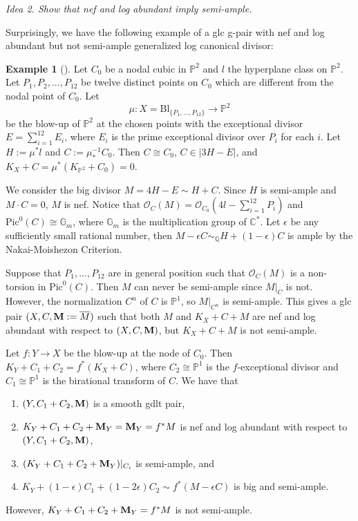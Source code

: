 \documentclass[11pt]{amsart}
\numberwithin{equation}{section}
\newcommand{\Mm}{{\bf{M}}}
\newcommand{\Cc}{\mathbb{C}}
\newcommand{\Pp}{\mathbb{P}}
\newcommand{\Qq}{\mathbb{Q}}
\newcommand{\Oo}{\mathcal{O}}
\newcommand{\Pic}{\mathrm{Pic}}
\theoremstyle{definition}
\theoremstyle{definition}
\newtheorem{ex}[thm]{Example}
\theoremstyle{definition}
\begin{document}
\smallskip

\noindent\textit{Idea 2. Show that nef and log abundant imply semi-ample.}

\smallskip

Surprisingly, we have the following example of a glc g-pair with nef
and log abundant but not semi-ample generalized log canonical divisor:

\begin{ex}[{\cite[Example 1.4]{LX22}}]\label{ex: log abundant not semi-ample}
  Let $C_0$ be a nodal cubic in $\Pp^2$ and $l$ the hyperplane class
  on $\Pp^2$. Let $P_1,P_2,...,P_{12}$ be twelve distinct points on
  $C_0$ which are different from the nodal point of $C_0$. Let
  $$
  \mu:X=\text{Bl}_{\{P_1,...,P_{12}\}}\to\Pp^2
  $$
  be the blow-up of $\Pp^2$ at the chosen points with the exceptional
  divisor $E=\sum_{i=1}^{12}E_i$, where $E_i$ is the prime
  exceptional divisor over $P_i$ for each $i$. Let $H:=\mu^*l$ and
  $C:=\mu^{-1}_*C_0$. Then $C\cong C_0$, $C\in|3H-E|$, and
  $K_X+C=\mu^*(K_{\Pp^2}+C_0)=0$.

  We consider the big divisor $M=4H-E\sim H+C$. Since $H$ is
  semi-ample and $M\cdot C=0$, $M$ is nef. Notice that
  $\Oo_C(M)=\Oo_{C_0}(4l-\sum_{i=1}^{12}P_i)$ and
  $\Pic^0(C)\cong\mathbb G_m$, where $\mathbb G_m$ is the
  multiplication group of $\Cc^*$. Let $\epsilon$ be any sufficiently
  small rational number, then $M-\epsilon C\sim_{\Qq}H+(1-\epsilon)C$
  is ample by the Nakai-Moishezon Criterion.

  Suppose that $P_1,...,P_{12}$ are in general position such that
  $\Oo_C(M)$ is a non-torsion in $\Pic^0(C)$. Then $M$ can never be
  semi-ample since $M|_C$ is not. However, the normalization $C^n$ of
  $C$ is $\Pp^1$, so $M|_{C^n}$ is semi-ample. This gives a glc pair
  $(X,C,\Mm:=\overline{M})$ such that both $M$ and $K_X+C+M$ are nef
  and log abundant with respect to $(X,C,\Mm)$, but $K_X+C+M$ is not semi-ample.

  Let $f: Y\to X$ be the blow-up at the node of $C_0$. Then
  $K_Y+C_1+C_2=f^*(K_X+C)$, where $C_2\cong \Pp^1$ is the
  $f$-exceptional divisor and $C_1\cong \Pp^1$ is the birational
  transform of $C$. We have that
  \begin{enumerate}
    \item $(Y,C_1+C_2,\Mm)$ is a smooth gdlt pair,
    \item $K_Y+C_1+C_2+\Mm_Y=\Mm_Y=f^*M$ is nef and log abundant with
      respect to $(Y,C_1+C_2,\Mm)$,
    \item $(K_Y+C_1+C_2+\Mm_Y)|_{C_i}$ is semi-ample, and
    \item $K_Y+(1-\epsilon)C_1+(1-2\epsilon)C_2\sim f^*(M-\epsilon
      C)$ is big and semi-ample.
  \end{enumerate}
  However, $K_Y+C_1+C_2+\Mm_Y=f^*M$ is not semi-ample.
\end{ex}
\end{document}
